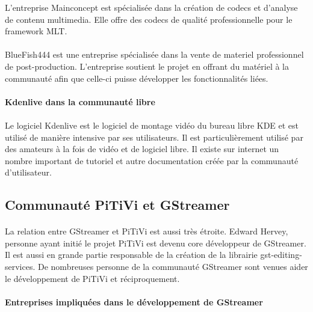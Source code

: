 L'entreprise Mainconcept est spécialisée dans la création de codecs
et d'analyse de contenu multimedia. Elle offre des codecs de qualité
professionnelle pour le framework MLT.

\paragraph{}

BlueFish444 est une entreprise spécialisée dans la vente de materiel
professionnel de post-production. L'entreprise soutient le projet
en offrant du matériel  à la communauté afin que celle-ci puisse
développer les fonctionnalités liées.

\paragraph{Kdenlive dans la communauté libre}

\paragraph{}

Le logiciel Kdenlive est le logiciel de montage vidéo du bureau libre
KDE et est utilisé de manière intensive par ses utilisateurs. Il est
particulièrement utilisé par des amateurs à la fois de vidéo et de
logiciel libre. Il existe sur internet un nombre important de tutoriel
et autre documentation créée par la communauté d'utilisateur.

\subsection {Communauté PiTiVi et GStreamer}

\paragraph {}

La relation entre GStreamer et PiTiVi est aussi très étroite. Edward
Hervey, personne ayant initié le projet PiTiVi est devenu core
développeur de GStreamer. Il est aussi en grande partie responsable de
la création de la librairie gst-editing-services. De nombreuses personne
de la communauté GStreamer sont venues aider le développement de PiTiVi
et réciproquement.

\paragraph {Entreprises impliquées dans le développement de GStreamer}

